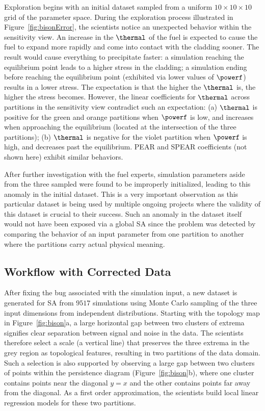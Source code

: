 Exploration begins with an initial dataset sampled from a
uniform $10\times10\times10$ grid of the parameter space.
%
During the exploration process illustrated in Figure~\ref{fig:bisonError}, the scientists notice an unexpected behavior within the sensitivity view.
%
An increase in the $\thermal$ of the fuel is expected to cause the fuel to expand more rapidly and come into contact with the cladding sooner.
%
The result would cause everything to precipitate faster: a simulation reaching the equilibrium point leads to a higher stress in the cladding; a simulation ending before reaching the equilibrium point (exhibited via lower values of $\powerf$) results in a lower stress.
%
The expectation is that the higher the $\thermal$ is, the higher the stress becomes.
%
However, the linear coefficients for $\thermal$ across partitions in the sensitivity view contradict such an expectation:
(a) $\thermal$ is positive for the green and orange partitions when $\powerf$ is low, and increases when approaching the equilibrium (located at the intersection of the three partitions);
(b) $\thermal$ is negative for the violet partition when $\powerf$ is high, and decreases past the equilibrium.
PEAR and SPEAR coefficients (not shown here) exhibit similar behaviors.

After further investigation with the fuel experts, simulation parameters aside from the three sampled were found to be improperly initialized, leading to this anomaly in the initial dataset.
%
This is a very important observation as this particular dataset is being used by multiple ongoing projects where the validity of this dataset is crucial to their success.
%
%
Such an anomaly in the dataset itself would not have been exposed via a global SA since the problem was detected by comparing the behavior of an input parameter from one partition to another where the partitions carry actual physical meaning.

\subsection{Workflow with Corrected Data}
\label{sec:workflow}
After fixing the bug associated with the simulation input, a new dataset is generated for SA from $9517$ simulations using Monte Carlo sampling of the three input dimensions from independent distributions.
%
Starting with the topology map in Figure~\ref{fig:bison}a, a large horizontal gap between two clusters of extrema signifies clear separation between signal and noise in the data.
%
The scientists therefore select a scale (a vertical line) that preserves the three extrema in the grey region as topological features, resulting in two partitions of the data domain.
%
Such a selection is also supported by observing a large gap between two clusters of points within the persistence diagram (Figure~\ref{fig:bison}b), where one cluster contains points near the diagonal $y=x$ and the other contains points far away from the diagonal.
%
As a first order approximation, the scientists build local linear regression models for these two partitions.

